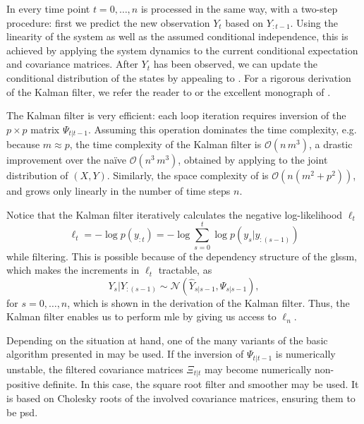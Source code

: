 In  every time point $t = 0, \dots, n$ is processed in the same way, with a two-step procedure: first we predict the new observation $Y_{t}$ based on $Y_{:t-1}$. Using the linearity of the system as well as the assumed conditional independence, this is achieved by applying the system dynamics to the current conditional expectation and covariance matrices. After $Y_{t}$ has been observed, we can update the conditional distribution of the states by appealing to . For a rigorous derivation of the Kalman filter, we refer the reader to \citep[Chapter 4]{Durbin2012Time} or the excellent monograph of \citep{Schneider1986Kalmanfilter}. 

The Kalman filter is very efficient: each loop iteration requires inversion of the $p \times p$ matrix $\Psi_{t | t - 1}$. Assuming this operation dominates the time complexity, e.g. because $m \approx p$, the time complexity of the Kalman filter is $\mathcal O(n\,m^{3})$, a drastic improvement over the naïve $\mathcal O(n^{3}\,m^{3})$, obtained by applying  to the joint distribution of $(X,Y)$. Similarly, the space complexity of  is $\mathcal O \left( n \left( m^{2} + p^{2} \right) \right)$, and grows only linearly in the number of time steps $n$.

Notice that the Kalman filter iteratively calculates the negative log-likelihood $\ell_{t}$
$$\ell_{t} = - \log p(y_{:t}) = - \log \sum_{s = 0}^t \log p(y_{s} | y_{:(s - 1)})$$ 
while filtering. This is possible because of the dependency structure of the \acrshort{glssm}, which makes the increments in $\ell_{t}$ tractable, as
$$
Y_{s} | Y_{:(s -1)} \sim \mathcal N \left( \hat Y_{s|s-1}, \Psi_{s|s - 1} \right),
$$
for $s = 0, \dots, n$, which is shown in the derivation of the Kalman filter. Thus, the Kalman filter enables us to perform \acrshort{mle} by giving us access to $\ell_{n}$.

Depending on the situation at hand, one of the many variants of the basic algorithm presented in  may be used. If the inversion of $\Psi_{t|t-1}$ is numerically unstable, the filtered covariance matrices $\Xi_{t|t}$ may become numerically non-positive definite. In this case, the square root filter and smoother \citep{Morf1975Squareroot} may be used. It is based on Cholesky roots of the involved covariance matrices, ensuring them to be \acrshort{psd}.

